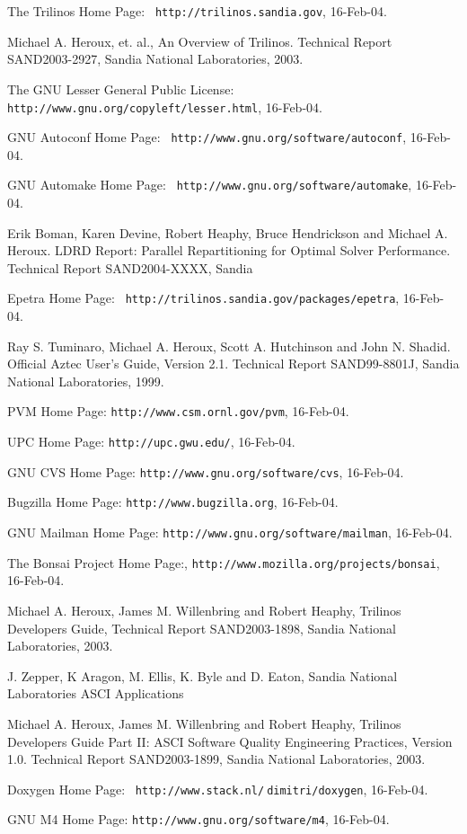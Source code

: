 \documentclass[]{llncs}      %
\begin{document}
\begin{thebibliography}{10}

 The Trilinos Home Page: {\tt
http://trilinos.sandia.gov}, 16-Feb-04.


 Michael A. Heroux, et. al., An Overview of
 Trilinos. Technical Report SAND2003-2927, Sandia National Laboratories,
 2003.

 The GNU Lesser General Public License: {\tt
http://www.gnu.org/copyleft/lesser.html}, 16-Feb-04.

 GNU Autoconf Home Page: {\tt
 http://www.gnu.org/software/autoconf}, 16-Feb-04.

 GNU Automake Home Page: {\tt
 http://www.gnu.org/software/automake}, 16-Feb-04.

 Erik Boman, Karen Devine, Robert Heaphy, Bruce Hendrickson
 and Michael A. Heroux. LDRD Report: Parallel Repartitioning for Optimal
 Solver Performance. Technical Report SAND2004-XXXX, Sandia

 Epetra Home Page: {\tt
 http://trilinos.sandia.gov/packages/epetra}, 16-Feb-04.

 Ray S. Tuminaro, Michael A. Heroux, Scott A. Hutchinson and
 John N. Shadid. Official Aztec User’s Guide, Version 2.1. Technical
 Report SAND99-8801J, Sandia National Laboratories, 1999.

 PVM Home Page: {\tt http://www.csm.ornl.gov/pvm}, 16-Feb-04.

 UPC Home Page: {\tt http://upc.gwu.edu/}, 16-Feb-04.

 GNU CVS Home Page: {\tt http://www.gnu.org/software/cvs},
 16-Feb-04.

 Bugzilla Home Page: {\tt http://www.bugzilla.org},
 16-Feb-04.

 GNU Mailman Home Page: {\tt http://www.gnu.org/software/mailman}, 16-Feb-04.

 The Bonsai Project Home Page:,
 {\tt http://www.mozilla.org/projects/bonsai}, 16-Feb-04.

 Michael A. Heroux, James M. Willenbring and Robert Heaphy,
 Trilinos Developers Guide, Technical Report SAND2003-1898, Sandia
 National Laboratories, 2003.

 J. Zepper, K Aragon, M. Ellis, K. Byle and D. Eaton, Sandia
 National Laboratories ASCI Applications

 Michael A. Heroux, James M. Willenbring and Robert Heaphy,
 Trilinos Developers Guide Part II: ASCI Software Quality Engineering
 Practices, Version 1.0. Technical Report SAND2003-1899, Sandia National
 Laboratories, 2003.

 Doxygen Home Page: {\tt
 http://www.stack.nl/$~$dimitri/doxygen}, 16-Feb-04.

 GNU M4 Home Page: {\tt http://www.gnu.org/software/m4},
 16-Feb-04.

\end{thebibliography}
\end{document}
